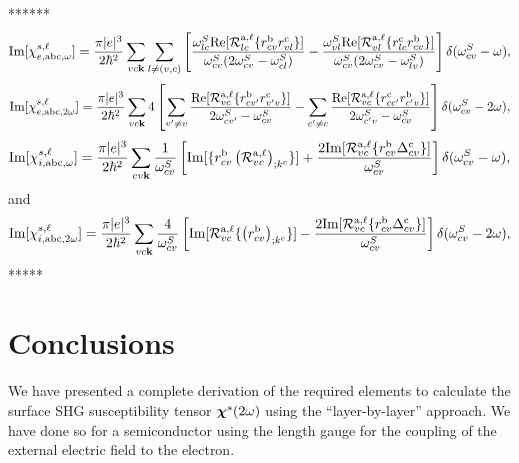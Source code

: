 \documentclass{article}
\begin{document}
******
\begin{equation}\label{imchiewn}
\mathrm{Im}[\chi_{e,\mathrm{a}\mathrm{b}\mathrm{c},\omega}^{s,\ell}]
=
\frac{\pi |e|^3}{2\hbar^2} 
\sum_{vc\mathbf{k}}
\sum_{l\neq(v,c)}
\left[
\frac{\omega^S_{lc}\mathrm{Re}[{\cal R}^{\mathrm{a},\ell}_{lc}\{r^{\mathrm{b}}_{cv}r^{\mathrm{c}}_{vl}\}]}
{\omega^S_{cv}(2\omega^S_{cv}-\omega^S_{cl})}
-
\frac{\omega^S_{vl}\mathrm{Re}[{\cal R}^{\mathrm{a},\ell}_{vl}\{r^{\mathrm{c}}_{lc}r^{\mathrm{b}}_{cv}\}]}
{\omega^S_{cv}(2\omega^S_{cv}-\omega^S_{lv})}
\right]
\delta(\omega^S_{cv}-\omega)
,
\end{equation}  
\begin{equation}\label{imchie2wn}
\mathrm{Im}[\chi_{e,\mathrm{a}\mathrm{b}\mathrm{c},2\omega}^{s,\ell}]
=
\frac{\pi |e|^3}{2\hbar^2} 
\sum_{vc\mathbf{k}}
4
\left[
\sum_{v'\ne v}
\frac{\mathrm{Re}[{\cal
    R}^{\mathrm{a},\ell}_{vc}\{r^{\mathrm{b}}_{cv'}r^{\mathrm{c}}_{v'v}\}]}{2\omega^S_{cv'}-\omega^S_{cv}}
-
\sum_{c'\ne c}
\frac{\mathrm{Re}[{\cal R}^{\mathrm{a},\ell}_{vc}\{r^{\mathrm{c}}_{cc'}r^{\mathrm{b}}_{c'v}\}]}
{2\omega^S_{c'v}-\omega^S_{cv}}
\right]
\delta(\omega^S_{cv}-2\omega)
,
\end{equation}
\begin{equation}\label{imchiwn}
\mathrm{Im}[\chi_{i,\mathrm{a}\mathrm{b}\mathrm{c},\omega}^{s,\ell}]
=
\frac{\pi|e|^3}{2\hbar^2}
\sum_{cv\mathbf{k}}
\frac{1}{\omega^S_{cv}}
\left[
\mathrm{Im}[\{r^{\mathrm{b}}_{cv}\left({\cal R}^{\mathrm{a},\ell}_{vc}\right)_{;k^{\mathrm{c}}}\}]
+
\frac{2\mathrm{Im}[{\cal R}^{\mathrm{a},\ell}_{vc}\{r^{\mathrm{b}}_{cv}\Delta^{\mathrm{c}}_{cv}\}]}{\omega^S_{cv}}
\right]
\delta(\omega^S_{cv}-\omega)
,
\end{equation}
and
\begin{equation}\label{imchi2wn}
\mathrm{Im}[\chi_{i,\mathrm{a}\mathrm{b}\mathrm{c},2\omega}^{s,\ell}]
=
\frac{\pi|e|^3}{2\hbar^2}\sum_{vc\mathbf{k}}
\frac{4}{\omega^S_{cv}}
\left[
\mathrm{Im}[{\cal R}^{\mathrm{a},\ell}_{vc}\{\left(r^{\mathrm{b}}_{cv}\right)_{;k^{\mathrm{c}}}\}]
-
\frac{2\mathrm{Im}[{\cal R}^{\mathrm{a},\ell}_{vc}\{r^{\mathrm{b}}_{cv}\Delta^{\mathrm{c}}_{cv}\}]}{\omega^S_{cv}}
\right]\delta(\omega^S_{cv}-2\omega)
,
\end{equation}
*****




\section{Conclusions}\label{con}

We have presented a complete derivation of the required elements to
calculate the surface SHG susceptibility tensor $\boldsymbol{\chi}^s(2\omega)$ 
using the ``layer-by-layer'' approach. We have done so for a
semiconductor using the 
length gauge for the coupling of the external electric field to the electron. 
\end{document}
